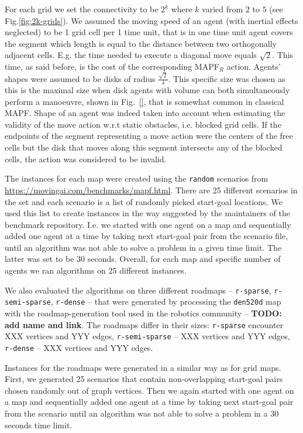 \documentclass[review]{elsarticle}
\newcommand\konstantin[1]{\nb{\textbf{Konstantin:}}{red}{#1}}
\newcommand{\mapfr}{\ac{MAPF}$_R$\xspace}
\newcommand{\mapf}{\ac{MAPF}\xspace}
\begin{document}
For each grid we set the connectivity to be $2^k$ where $k$ varied from $2$ to $5$ (see Fig.\ref{fig:2k-grids}). We assumed the moving speed of an agent (with inertial effects neglected) to be 1 grid cell per 1 time unit, that is in one time unit agent covers the segment which length is equal to the distance between two orthogonally adjacent cells. E.g. the time needed to execute a diagonal move equals $\sqrt{2}$. This time, as said before, is the cost of the corresponding \mapfr action. Agents' shapes were assumed to be disks of radius $ \frac{\sqrt{2}}{4}$. This specific size was chosen as this is the maximal size when disk agents with volume can both simultaneously perform a manoeuvre, shown in Fig.~\ref{}, that is somewhat common in classical \mapf. \konstantin{Not sure how to explain this in elegant way}
Shape of an agent was indeed taken into account when estimating the validity of the move action w.r.t static obstacles, i.e. blocked grid cells. If the endpoints of the segment representing a move action were the centers of the free cells but the disk that moves along this segment intersects any of the blocked cells, the action was considered to be invalid.

The instances for each map were created using the \texttt{random} scenarios from \url{https://movingai.com/benchmarks/mapf.html}. There are 25 different scenarios in the set and each scenario is a list of randomly picked start-goal locations. We used this list to create instances in the way suggested by the maintainers of the benchmark repository. I.e. we started with one agent on a map and sequentially added one agent at a time by taking next start-goal pair from the scenario file, until an algorithm was not able to solve a problem in a given time limit. The latter was set to be 30 seconds. Overall, for each map and specific number of agents we ran algorithms on 25 different instances.

We also evaluated the algorithms on three different roadmaps -- \texttt{r-sparse}, \texttt{r-semi-sparse}, \texttt{r-dense} -- that were generated by processing the \texttt{den520d} map with the roadmap-generation tool used in the robotics community -- \textbf{TODO: add name and link}. The roadmaps differ in their sizes: \texttt{r-sparse} encounter XXX vertices and YYY edges, \texttt{r-semi-sparse} -- XXX vertices and YYY edges, \texttt{r-dense} -- XXX vertices and YYY edges.

Instances for the roadmaps were generated in a similar way as for grid maps. First, we generated 25 scenarios that contain non-overlapping start-goal pairs chosen randomly out of graph vertices. Then we again started with one agent on a map and sequentially added one agent at a time by taking next start-goal pair from the scenario until an algorithm was not able to solve a problem in a 30 seconds time limit.
\end{document}
